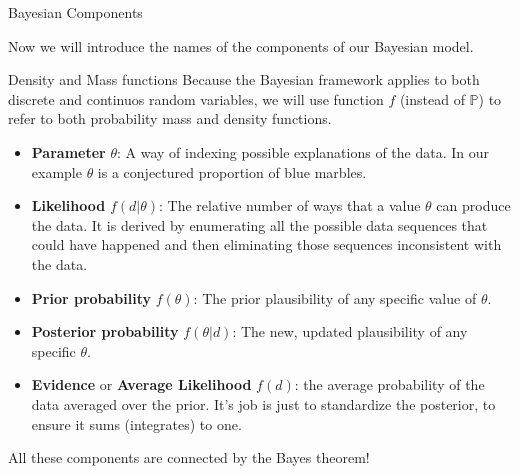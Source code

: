 \documentclass[handout]{beamer}
\begin{document}
\begin{frame}{Bayesian Components}
\scriptsize{
Now we will introduce the names of the components of our Bayesian model. \\


\begin{block}{Density and Mass functions}
Because the Bayesian framework applies to both discrete and continuos random variables, we will use function $f$ (instead of $\mathbb{P}$) to refer to both probability mass and density functions.
\end{block}

\begin{itemize}
\item \textbf{Parameter} $\theta$:  A way of indexing possible explanations of the data. In our example $\theta$ is a conjectured proportion of blue marbles. 

\item \textbf{Likelihood} $f(d|\theta)$: The relative number of ways that a value $\theta$ can produce the data. It is derived by enumerating all the possible data sequences that could have happened and then eliminating those sequences inconsistent with the data.
\item \textbf{Prior probability} $f(\theta)$: The prior plausibility of any specific value of $\theta$.
 
\item \textbf{Posterior probability} $f(\theta|d)$: The new, updated plausibility of any specific $\theta$. 

\item \textbf{Evidence} or \textbf{Average Likelihood} $f(d)$: the average probability of the data averaged over the prior. It’s job is just to standardize the posterior, to ensure it sums (integrates) to one. 
 
\end{itemize}
 } 

All these components are connected by the Bayes theorem!
 
\end{frame}
\end{document}
